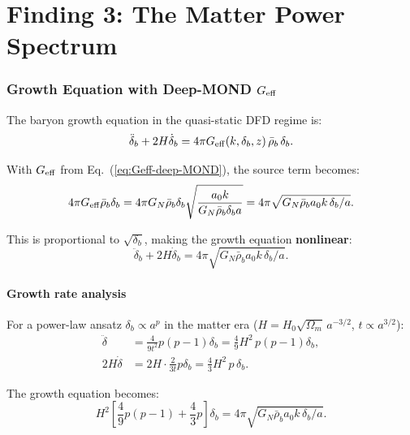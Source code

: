 \documentclass[11pt]{article}
\newcommand{\Geff}{G_{\rm eff}}
\begin{document}
\part{Finding 3: The Matter Power Spectrum}
\label{part:Pk}

\section{Growth Equation with Deep-MOND $\Geff$}

The baryon growth equation in the quasi-static DFD regime is:
\begin{equation}
\ddot\delta_b + 2H\dot\delta_b = 4\pi\Geff(k,\delta_b,z)\,\bar\rho_b\,\delta_b.
\label{eq:growth}
\end{equation}

With $\Geff$ from Eq.~(\ref{eq:Geff-deep-MOND}), the source term
becomes:
\begin{equation}
4\pi\Geff\bar\rho_b\delta_b
= 4\pi G_N \bar\rho_b\delta_b\sqrt{\frac{a_0 k}{G_N\bar\rho_b\delta_b a}}
= 4\pi\sqrt{G_N\bar\rho_b a_0 k\,\delta_b / a}.
\end{equation}

This is proportional to $\sqrt{\delta_b}$, making the growth equation
\textbf{nonlinear}:
\begin{equation}
\ddot\delta_b + 2H\dot\delta_b = 4\pi\sqrt{G_N\bar\rho_b a_0 k\,\delta_b / a}.
\label{eq:growth-nonlinear}
\end{equation}

\subsection{Growth rate analysis}

For a power-law ansatz $\delta_b \propto a^p$ in the matter era
($H = H_0\sqrt{\Omega_m}\,a^{-3/2}$, $t \propto a^{3/2}$):
\begin{align}
\ddot\delta &= \frac{4}{9t^2}p(p-1)\delta_b = \frac{4}{9}H^2\,p(p-1)\delta_b, \\
2H\dot\delta &= 2H\cdot\frac{2}{3t}p\delta_b = \frac{4}{3}H^2\,p\,\delta_b.
\end{align}

The growth equation becomes:
\begin{equation}
H^2\left[\frac{4}{9}p(p-1) + \frac{4}{3}p\right]\delta_b
= 4\pi\sqrt{G_N\bar\rho_b a_0 k\,\delta_b/a}.
\end{equation}
\end{document}
